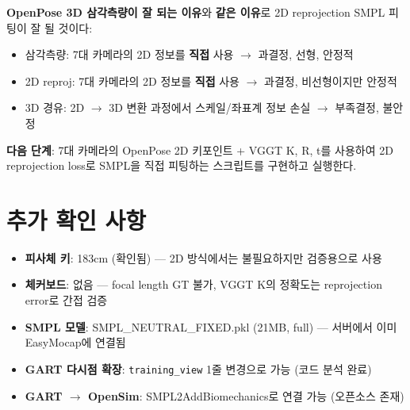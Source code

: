 \documentclass[11pt, a4paper]{report}
\begin{document}
\begin{summary}[title={핵심 결론}]
\textbf{OpenPose 3D 삼각측량이 잘 되는 이유}와 \textbf{같은 이유}로 2D reprojection SMPL 피팅이 잘 될 것이다:
\begin{itemize}[leftmargin=*]
  \item 삼각측량: 7대 카메라의 2D 정보를 \textbf{직접} 사용 $\rightarrow$ 과결정, 선형, 안정적
  \item 2D reproj: 7대 카메라의 2D 정보를 \textbf{직접} 사용 $\rightarrow$ 과결정, 비선형이지만 안정적
  \item 3D 경유: 2D $\rightarrow$ 3D 변환 과정에서 스케일/좌표계 정보 손실 $\rightarrow$ 부족결정, 불안정
\end{itemize}

\textbf{다음 단계}: 7대 카메라의 OpenPose 2D 키포인트 + VGGT K, R, t를 사용하여 2D reprojection loss로 SMPL을 직접 피팅하는 스크립트를 구현하고 실행한다.
\end{summary}


\section{추가 확인 사항}

\begin{itemize}[leftmargin=*]
  \item \textbf{피사체 키}: 183cm (확인됨) --- 2D 방식에서는 불필요하지만 검증용으로 사용
  \item \textbf{체커보드}: 없음 --- focal length GT 불가, VGGT K의 정확도는 reprojection error로 간접 검증
  \item \textbf{SMPL 모델}: SMPL\_NEUTRAL\_FIXED.pkl (21MB, full) --- 서버에서 이미 EasyMocap에 연결됨
  \item \textbf{GART 다시점 확장}: \texttt{training\_view} 1줄 변경으로 가능 (코드 분석 완료)
  \item \textbf{GART $\rightarrow$ OpenSim}: SMPL2AddBiomechanics로 연결 가능 (오픈소스 존재)
\end{itemize}
\end{document}
